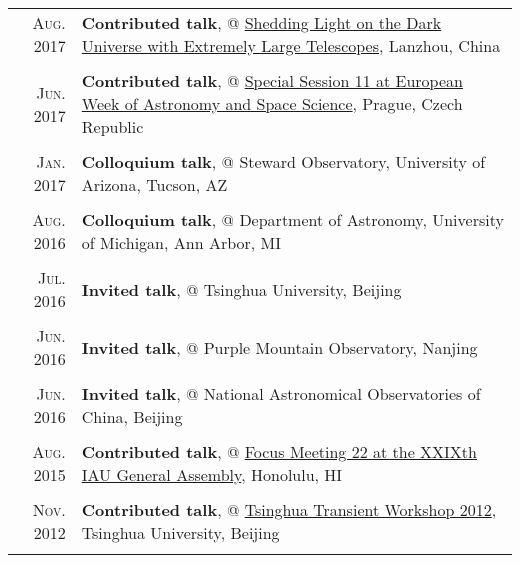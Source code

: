 \documentclass[letterpaper,11pt]{article}
\begin{document}
\begin{longtable}{r|p{5.6in}}
    \textsc{Aug. 2017}   &   \textbf{Contributed talk}, @
    \href{http://darkuniverse2017.csp.escience.cn/dct/page/65580}{Shedding Light on
    the Dark Universe with Extremely Large Telescopes}, Lanzhou, China      \\
    \multicolumn{2}{c}{} \\

    \textsc{Jun. 2017}   &   \textbf{Contributed talk}, @
    \href{http://eas.unige.ch/EWASS2017/session.jsp?id=SS11}{Special Session 11 at
    European Week of Astronomy and Space Science}, Prague, Czech Republic   \\
    \multicolumn{2}{c}{} \\

    \textsc{Jan. 2017}   &   \textbf{Colloquium talk}, @ Steward Observatory, University of Arizona, Tucson, AZ \\
    \multicolumn{2}{c}{} \\

    \textsc{Aug. 2016}   &   \textbf{Colloquium talk}, @ Department of Astronomy, University of Michigan, Ann Arbor, MI \\
    \multicolumn{2}{c}{} \\

    \textsc{Jul. 2016}   &   \textbf{Invited talk}, @ Tsinghua University, Beijing \\
    \multicolumn{2}{c}{} \\


    \textsc{Jun. 2016}   &   \textbf{Invited talk}, @ Purple Mountain Observatory, Nanjing \\
    \multicolumn{2}{c}{} \\

    \textsc{Jun. 2016}   &   \textbf{Invited talk}, @ National Astronomical Observatories of China, Beijing   \\
    \multicolumn{2}{c}{} \\

    \textsc{Aug. 2015}   &   \textbf{Contributed talk}, @ \href{http://hffiau.epfl.ch/page-116896.html}{Focus Meeting 22 at the XXIXth IAU General Assembly}, Honolulu, HI     \\
    \multicolumn{2}{c}{} \\

    \textsc{Nov. 2012}   &   \textbf{Contributed talk}, @ \href{http://www.phys.tsinghua.edu.cn/publish/phy/5287/2012/20121102084855753317440/20121102084855753317440_.html}{Tsinghua Transient Workshop 2012}, Tsinghua University, Beijing   \\
    \multicolumn{2}{c}{} \\


\end{longtable}
\end{document}
